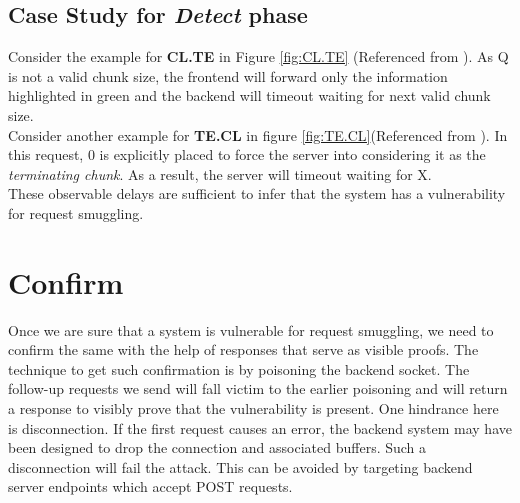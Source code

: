 \subsection{Case Study for \textit{Detect} phase}
Consider the example for \textbf{CL.TE} in Figure \ref{fig:CL.TE} (Referenced from \cite{b6}). As \textcolor{myred}{Q} is not a valid chunk size, the frontend will forward only the information highlighted in \textcolor{mygreen}{green} and the backend will timeout waiting for next valid chunk size. \\
Consider another example for \textbf{TE.CL} in figure \ref{fig:TE.CL}(Referenced from \cite{b6}). In this request, \textcolor{mygreen}{0} is explicitly placed to force the server into considering it as the \textit{terminating chunk}. As a result, the server will timeout waiting for \textcolor{myred}{X}.\\
These observable delays are sufficient to infer that the system has a vulnerability for request smuggling.\\

\section{Confirm}
Once we are sure that a system is vulnerable for request smuggling, we need to confirm the same with the help of responses that serve as visible proofs. The technique to get such confirmation is by poisoning the backend socket. The follow-up requests we send will fall victim to the earlier poisoning and will return a response to visibly prove that the vulnerability is present. One hindrance here is disconnection. If the first request causes an error, the backend system may have been designed to drop the connection and associated buffers. Such a disconnection will fail the attack. This can be avoided by targeting backend server endpoints which accept POST requests. 
